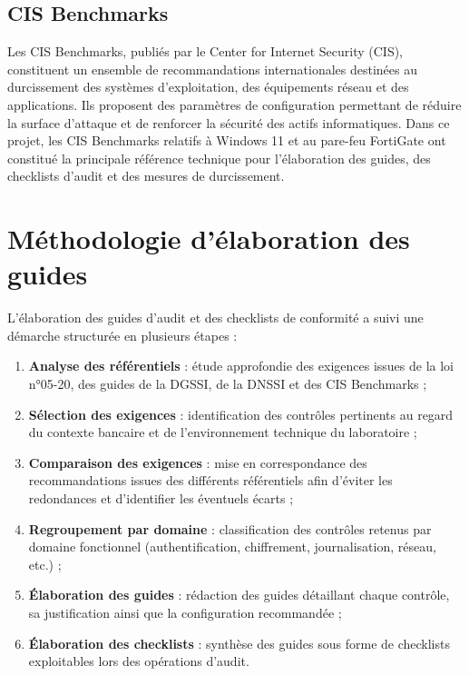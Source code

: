 \subsection{CIS Benchmarks}

Les CIS Benchmarks, publiés par le Center for Internet Security (CIS), constituent un ensemble de recommandations internationales destinées au durcissement des systèmes d'exploitation, des équipements réseau et des applications. Ils proposent des paramètres de configuration permettant de réduire la surface d'attaque et de renforcer la sécurité des actifs informatiques. Dans ce projet, les CIS Benchmarks relatifs à Windows 11 et au pare-feu FortiGate ont constitué la principale référence technique pour l'élaboration des guides, des checklists d'audit et des mesures de durcissement.

\section{Méthodologie d'élaboration des guides}

L'élaboration des guides d'audit et des checklists de conformité a suivi une démarche structurée en plusieurs étapes :

\begin{enumerate}
  \item \textbf{Analyse des référentiels} : étude approfondie des exigences issues de la loi n°05-20, des guides de la DGSSI, de la DNSSI et des CIS Benchmarks ;
  \item \textbf{Sélection des exigences} : identification des contrôles pertinents au regard du contexte bancaire et de l'environnement technique du laboratoire ;
  \item \textbf{Comparaison des exigences} : mise en correspondance des recommandations issues des différents référentiels afin d'éviter les redondances et d'identifier les éventuels écarts ;
  \item \textbf{Regroupement par domaine} : classification des contrôles retenus par domaine fonctionnel (authentification, chiffrement, journalisation, réseau, etc.) ;
  \item \textbf{Élaboration des guides} : rédaction des guides détaillant chaque contrôle, sa justification ainsi que la configuration recommandée ;
  \item \textbf{Élaboration des checklists} : synthèse des guides sous forme de checklists exploitables lors des opérations d'audit.
\end{enumerate}

